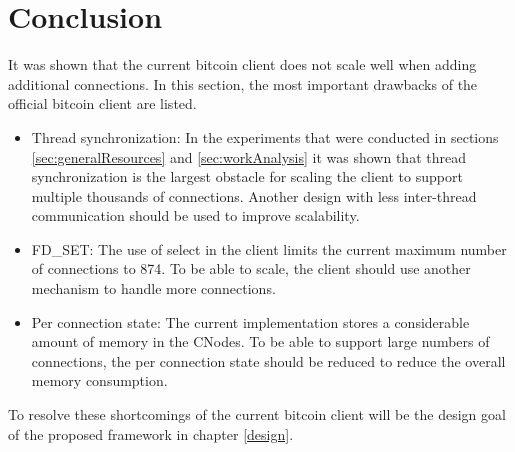 \section{Conclusion}
It was shown that the current bitcoin client does not scale well when adding additional connections. In this section, the most important drawbacks of the official bitcoin client are listed.
\begin{itemize}
	\item Thread synchronization: In the experiments that were conducted in sections \ref{sec:generalResources} and \ref{sec:workAnalysis} it was shown that thread synchronization is the largest obstacle for scaling the client to support multiple thousands of connections. Another design with less inter-thread communication should be used to improve scalability.
	\item FD\_SET: The use of select in the client limits the current maximum number of connections to 874. To be able to scale, the client should use another mechanism to handle more connections.
	\item Per connection state: The current implementation stores a considerable amount of memory in the CNodes. To be able to support large numbers of connections, the per connection state should be reduced to reduce the overall memory consumption.
\end{itemize}
To resolve these shortcomings of the current bitcoin client will be the design goal of the proposed framework in chapter \ref{design}.







